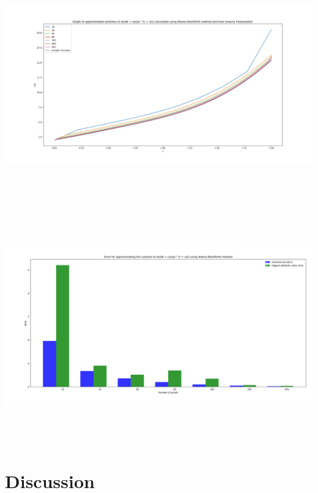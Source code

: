 \documentclass[10pt]{article}
\begin{document}
\begin{center}
\includegraphics[angle=0,height=10cm]{./img/adam_function.png}
\end{center}

\begin{center}
\includegraphics[angle=0,height=10cm]{./img/adam_error.png}
\end{center}

\section{Discussion}
\label{sec:org28e10e5}
\end{document}
